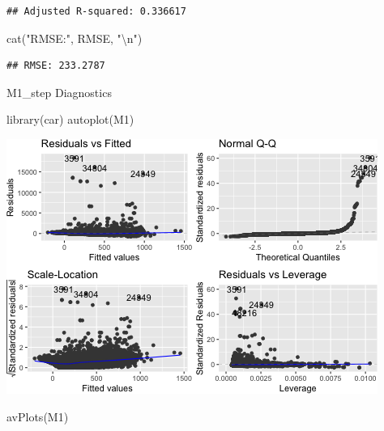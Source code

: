 \documentclass[
]{article}
\newenvironment{Shaded}{\begin{snugshade}}{\end{snugshade}}
\newcommand{\FunctionTok}[1]{\textcolor[rgb]{0.00,0.00,0.00}{#1}}
\newcommand{\NormalTok}[1]{#1}
\newcommand{\SpecialCharTok}[1]{\textcolor[rgb]{0.00,0.00,0.00}{#1}}
\newcommand{\StringTok}[1]{\textcolor[rgb]{0.31,0.60,0.02}{#1}}
\begin{document}
\begin{verbatim}
## Adjusted R-squared: 0.336617
\end{verbatim}

\begin{Shaded}
\begin{Highlighting}[]
\FunctionTok{cat}\NormalTok{(}\StringTok{"RMSE:"}\NormalTok{, RMSE, }\StringTok{"}\SpecialCharTok{\textbackslash{}n}\StringTok{"}\NormalTok{)}
\end{Highlighting}
\end{Shaded}

\begin{verbatim}
## RMSE: 233.2787
\end{verbatim}

M1\_step Diagnostics

\begin{Shaded}
\begin{Highlighting}[]
\FunctionTok{library}\NormalTok{(car)}
\FunctionTok{autoplot}\NormalTok{(M1)}
\end{Highlighting}
\end{Shaded}

\includegraphics{Project_files/figure-latex/unnamed-chunk-48-1.png}

\begin{Shaded}
\begin{Highlighting}[]
\FunctionTok{avPlots}\NormalTok{(M1)}
\end{Highlighting}
\end{Shaded}
\end{document}
